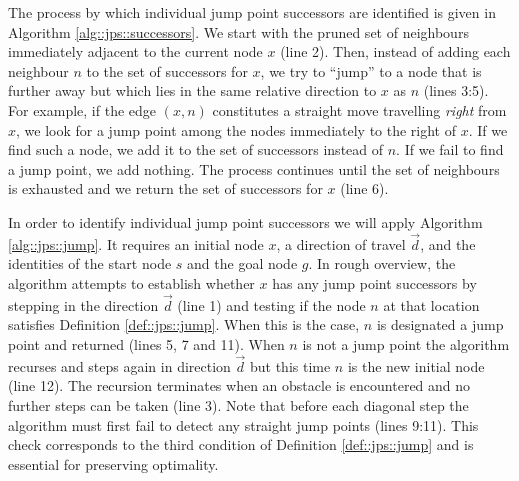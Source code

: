 The process by which individual jump point successors are identified is given in
Algorithm \ref{alg::jps::successors}.  We start with the pruned set of neighbours
immediately adjacent to the current node $x$ (line 2).  Then, instead of adding each
neighbour $n$ to the set of successors for $x$, we try to ``jump'' to a node
that is further away but which lies in the same relative direction to $x$ as $n$
(lines 3:5).  For example, if the edge $(x, n)$ constitutes a straight move
travelling \emph{right} from $x$, we look for a jump point among the nodes
immediately to the right of $x$.  If we find such a node, we add it to the set
of successors instead of $n$.  If we fail to find a jump point,
we add nothing.  The process continues until the set of neighbours is
exhausted and we return the set of successors for $x$ (line 6).

In order to identify individual jump point successors we will apply Algorithm
\ref{alg::jps::jump}. It requires an initial node $x$, a direction of travel
$\vec{d}$, and the identities of 
the start node $s$ and the goal node $g$.
In rough overview, the algorithm attempts to establish whether $x$ has any 
jump point successors by stepping in the direction $\vec{d}$ (line 1) and testing
if the node $n$ at that location satisfies Definition \ref{def::jps::jump}.
When this is the case, $n$ is designated a jump point and returned (lines 5, 7
and 11).
When $n$ is not a jump point the algorithm recurses and steps again in direction
$\vec{d}$ but this time $n$ is the new initial node (line 12).
The recursion terminates when an obstacle is encountered and no further
steps can be taken (line 3).
Note that before each diagonal step the algorithm must first 
fail to detect any straight jump points (lines 9:11). 
This check corresponds to the third condition of Definition \ref{def::jps::jump} 
and is essential for preserving optimality.
